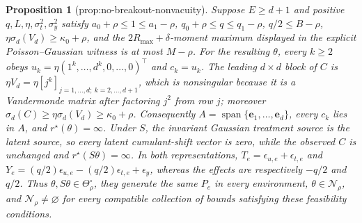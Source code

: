 \documentclass{article}
\newtheorem{proposition}{Proposition}
\begin{document}
\begin{proposition}[prop:no-breakout-nonvacuity]\label{prop:no-breakout-nonvacuity}
Suppose \(E\ge d+1\) and positive \(q,L,\eta,\sigma_t^2,\sigma_y^2\) satisfy \(a_0+\rho\le1\le a_1-\rho\), \(q_0+\rho\le q\le q_1-\rho\), \(q/2\le B-\rho\), \(\eta\sigma_d(V_d)\ge\kappa_0+\rho\), and the \(2R_{\max}+\delta\)-moment maximum displayed in the explicit Poisson--Gaussian witness is at most \(M-\rho\).  For the resulting \(\theta\), every \(k\ge2\) obeys \(u_k=\eta(1^k,\ldots,d^k,0,\ldots,0)^\top\) and \(c_k=u_k\).  The leading \(d\times d\) block of \(C\) is \(\eta V_d=\eta[j^k]_{j=1,\ldots,d;\ k=2,\ldots,d+1}\), which is nonsingular because it is a Vandermonde matrix after factoring \(j^2\) from row \(j\); moreover \(\sigma_d(C)\ge\eta\sigma_d(V_d)\ge\kappa_0+\rho\).  Consequently \(A=\operatorname{span}\{\mathbf e_1,\ldots,\mathbf e_d\}\), every \(c_k\) lies in \(A\), and \(r^\star(\theta)=\infty\).  Under \(S\), the invariant Gaussian treatment source is the latent source, so every latent cumulant-shift vector is zero, while the observed \(C\) is unchanged and \(r^\star(S\theta)=\infty\).  In both representations, \(T_e=\epsilon_{u,e}+\epsilon_{t,e}\) and \(Y_e=(q/2)\epsilon_{u,e}-(q/2)\epsilon_{t,e}+\epsilon_y\), whereas the effects are respectively \(-q/2\) and \(q/2\).  Thus \(\theta,S\theta\in\Theta_\rho^\circ\), they generate the same \(P_e\) in every environment, \(\theta\in\mathcal N_\rho\), and \(\mathcal N_\rho\ne\varnothing\) for every compatible collection of bounds satisfying these feasibility conditions.
\end{proposition}
\end{document}

